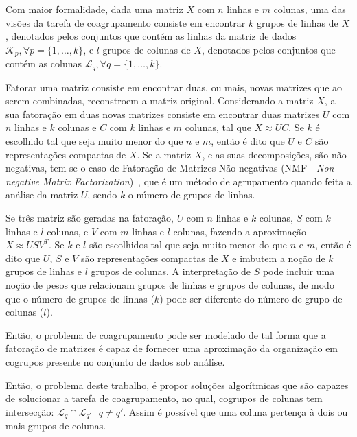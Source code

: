 \documentclass[
    12pt,                %
    oneside,            %
    a4paper,            %
    english,            %
    brazil                %
    ]{abntex2ppgsi}
\begin{document}
Com maior formalidade, dada uma matriz $X$ com $n$ linhas e $m$ colunas, uma das visões da tarefa de coagrupamento consiste em encontrar $k$ grupos de linhas de $X$, denotados pelos conjuntos que contém as linhas da matriz de dados $\mathcal{K}_p, \forall p = \{1, \dots, k\}$, e $l$ grupos de colunas de $X$, denotados pelos conjuntos que contém as colunas $\mathcal{L}_q, \forall q = \{1, \dots, k\}$.

Fatorar uma matriz consiste em encontrar duas, ou mais, novas matrizes que ao serem combinadas, reconstroem a matriz original.
Considerando a matriz $X$, a sua fatoração em duas novas matrizes consiste em encontrar duas matrizes $U$ com $n$ linhas e $k$ colunas e $C$ com $k$ linhas e $m$ colunas, tal que $X \approx UC$.
Se $k$ é escolhido tal que seja muito menor do que $n$ e $m$, então é dito que $U$ e $C$ são representações compactas de $X$.
Se a matriz $X$, e as suas decomposições, são não negativas, tem-se o caso de Fatoração de Matrizes Não-negativas (NMF - \textit{Non-negative Matrix Factorization})~\cite{lee:nnmf00}, que é um método de agrupamento quando feita a análise da matriz $U$, sendo $k$ o número de grupos de linhas.

Se três matriz são geradas na fatoração, $U$ com $n$ linhas e $k$ colunas, $S$ com $k$ linhas e $l$ colunas, e $V$ com $m$ linhas e $l$ colunas, fazendo a aproximação $X \approx USV^T$.
Se $k$ e $l$ são escolhidos tal que seja muito menor do que $n$ e $m$, então é dito que $U$, $S$ e $V$ são representações compactas de $X$ e imbutem a noção de $k$ grupos de linhas e $l$ grupos de colunas.
A interpretação de $S$ pode incluir uma noção de pesos que relacionam grupos de linhas e grupos de colunas, de modo que o número de grupos de linhas ($k$) pode ser diferente do número de grupo de colunas ($l$).

Então, o problema de coagrupamento pode ser modelado de tal forma que a fatoração de matrizes é capaz de fornecer uma aproximação da organização em cogrupos presente no conjunto de dados sob análise.

Então, o problema deste trabalho, é propor soluções algorítmicas que são capazes de solucionar a tarefa de coagrupamento, no qual, cogrupos de colunas tem intersecção: $\mathcal{L}_q \cap \mathcal{L}_{q'}~|~q \neq q'$.
Assim é possível que uma coluna pertença à dois ou mais grupos de colunas.


\end{document}
